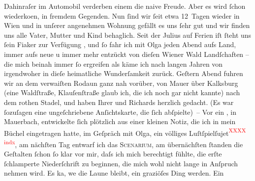 \begin{ledgroupsized}[t]{13cm}
               Dahinraſer im Automobil verderben einem die naive Freude. Aber es wird ſchon
                  wiederko{\geminationm}en, in fremdem Gegenden.\pend
           \pstart
           Nun ſind wir ſeit etwa 12 Tagen wieder in Wien und in
               unſerer {\pb}angenehmen Wohnung gefällt es uns ſehr gut und
               wir finden uns alle Vater, Mutter und Kind
               behaglich. Seit der Julius auf Ferien iſt ſteht
               uns ſein Fiaker zur Verfügung , und ſo fahr ich
               mit Olga jeden Abend aufs Land, immer aufs neue u
               immer mehr entzückt von dieſen Wiener Wald
               Landſchaften – die mich beinah immer ſo ergreifen als käme ich nach langen Jahren von
               irgendwoher in dieſe heimatliche Wunderſamkeit zurück. Geſtern Abend fuhren wir an
               dem verwaiſten Ro{\pb}daun
               ganz nah vorüber, von Mauer über Kalksburg (eine Waldſtraße, Klauſenſtraße glaub ich, die ich noch gar nicht kannte) nach dem rothen Stadel, und haben Ihrer und Richards herzlich gedacht. (Es war ſozuſagen eine
               ungeſchriebene Anſichtskarte, die ſich abſpielte) –\pend
           \pstart
           Vor ein \label{K_L01422_2v}\label{K_L01422_2h}, in Mauerbach,
               entwickelte ſich plötzlich aus einer kleinen Notiz, die ich in mein Büchel
               eingetragen hatte, im Geſpräch mit Olga, ein
               völliges Luſtſpielſujet\textcolor{red}{\textsuperscript{XXXX indx}}, am
               nächſten Tag ent{\pb}warf ich das \textsc{Scenarium}, am übernächſten ſtanden die Geſtalten ſchon ſo klar vor mir, daſs
               ich mich berechtigt fühlte, die erſte ſchlamperte Niederſchrift zu beginnen, die mich
               wohl nicht lange in Anſpruch nehmen wird. Es ka{\geminationn}, we{\geminationn} die Laune bleibt, ein graziöſes Ding werden. Ein

\end{ledgroupsized}
